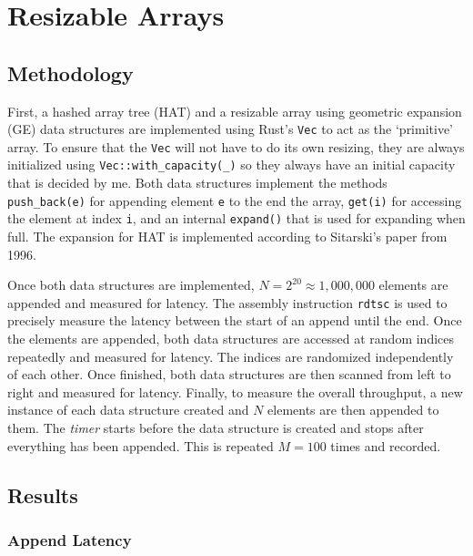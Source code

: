 \section{Resizable Arrays}

\subsection{Methodology}

First, a hashed array tree (HAT) and a resizable array using geometric expansion (GE) data structures are implemented using Rust's \texttt{Vec} to act as the `primitive' array. To ensure that the \texttt{Vec} will not have to do its own resizing, they are always initialized using \texttt{Vec::with_capacity(_)} so they always have an initial capacity that is decided by me. Both data structures implement the methods \texttt{push_back(e)} for appending element \texttt{e} to the end the array, \texttt{get(i)} for accessing the element at index \texttt{i}, and an internal \texttt{expand()} that is used for expanding when full. The expansion for HAT is implemented according to Sitarski's paper from 1996.

Once both data structures are implemented, $N = 2^{20} \approx 1,000,000$ elements are appended and measured for latency. The assembly instruction \texttt{rdtsc} is used to precisely measure the latency between the start of an append until the end. Once the elements are appended, both data structures are accessed at random indices repeatedly and measured for latency. The indices are randomized independently of each other. Once finished, both data structures are then scanned from left to right and measured for latency. Finally, to measure the overall throughput, a new instance of each data structure created and $N$ elements are then appended to them. The \textit{timer} starts before the data structure is created and stops after everything has been appended. This is repeated $M = 100$ times and recorded.

\subsection{Results}

\begingroup

\subsubsection{Append Latency}

